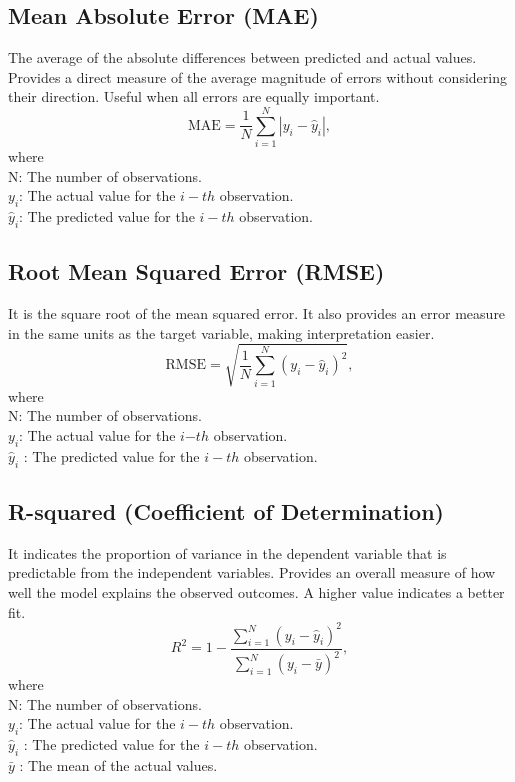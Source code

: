 \documentclass{book}
\numberwithin{equation}{section}
\numberwithin{figure}{section}
\begin{document}
\subsection{Mean Absolute Error (MAE)}
\label{mae}
\vspace{-5mm} %
The average of the absolute differences between predicted and actual values. Provides a direct measure of the average magnitude of errors without considering their direction. Useful when all errors are equally important\cite{MAE_ref}.\\
$$\text{MAE} = \frac{1}{N} \sum_{i=1}^{N} |y_i - \hat{y}_i|,$$
where\\
 N: The number of observations.\\
$y_i$: The actual value for the ${i-th}$ observation.\\
$\hat{y}_i$: The predicted value for the ${i-th}$ observation.
\vspace{-5mm} %
\subsection{Root Mean Squared Error (RMSE)}
\label{rmse}
\vspace{-5mm} %
It is the square root of the mean squared error. It also provides an error measure in the same units as the target variable, making interpretation easier\cite{RMSE_ref}.\\
$$\text{RMSE} = \sqrt{\frac{1}{N} \sum_{i=1}^{N} (y_i - \hat{y}_i)^2},$$
where\\
 N: The number of observations.\\
 $y_i$: The actual value for the $i{-th}$ observation.\\
$\hat{y}_i$ : The predicted value for the ${i-th}$ observation.

\vspace{-5mm} %
\subsection{R-squared (Coefficient of Determination)}
\label{r}
\vspace{-5mm} %
It indicates the proportion of variance in the dependent variable that is predictable from the independent variables. Provides an overall measure of how well the model explains the observed outcomes. A higher value indicates a better fit\cite{R2_ref}.\\
$$R^2 = 1 - \frac{\sum_{i=1}^{N} (y_i - \hat{y}_i)^2}{\sum_{i=1}^{N} (y_i - \bar{y})^2},$$
where\\
 N: The number of observations.\\
 $y_i$: The actual value for the ${i-th}$ observation.\\
$\hat{y}_i$ : The predicted value for the ${i-th}$ observation.\\ 
$\bar{y}$ : The mean of the actual values.
\end{document}
